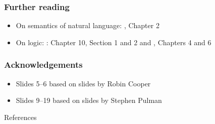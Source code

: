 \documentclass{beamer}
\begin{document}
\begin{frame}

\frametitle{Further reading}

\begin{itemize}

\item On semantics of natural language: \cite{Chierchia:2000uq}, Chapter 2

\item On logic: \href{http://www.nltk.org/book/ch10.html}{\cite{Bird:2009ab}}:
  Chapter 10, Section 1 and 2 and \cite{Allwood:1977aa}, Chapters 4 and 6


\end{itemize}


\end{frame}





\begin{frame}

\frametitle{Acknowledgements}

\begin{itemize}

\item Slides 5--6 based on slides by Robin Cooper

\item Slides 9--19 based on slides by Stephen Pulman

\end{itemize}

\end{frame}





\begin{frame}[allowframebreaks]{References}

\small





\end{frame}
\end{document}
